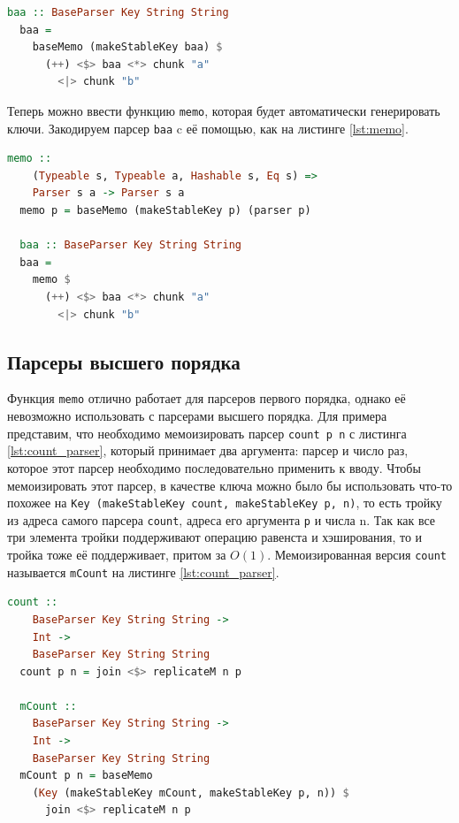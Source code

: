 \documentclass[times]{itmo-student-thesis}
\begin{document}
\begin{lstlisting}[language=Haskell,float=!h,caption={Пример использования makeStableKey},label={lst:makeStableKey_example}]
  baa :: BaseParser Key String String
  baa =
    baseMemo (makeStableKey baa) $
      (++) <$> baa <*> chunk "a"
        <|> chunk "b"
\end{lstlisting}

Теперь можно ввести функцию \lstinline{memo}, которая будет автоматически генерировать ключи. Закодируем парсер \lstinline{baa} c её
помощью, как на листинге \ref{lst:memo}.

\begin{lstlisting}[language=Haskell,float=!h,caption={Memo с автоматическим ключом},label={lst:memo}]
  memo :: 
    (Typeable s, Typeable a, Hashable s, Eq s) => 
    Parser s a -> Parser s a
  memo p = baseMemo (makeStableKey p) (parser p)

  baa :: BaseParser Key String String
  baa =
    memo $
      (++) <$> baa <*> chunk "a"
        <|> chunk "b"
\end{lstlisting}

\subsection{Парсеры высшего порядка}

Функция \lstinline{memo} отлично работает для парсеров первого порядка, однако её невозможно использовать с
парсерами высшего порядка. Для примера представим, что необходимо мемоизировать парсер
\lstinline{count p n} с листинга \ref{lst:count_parser}, который  принимает два аргумента: парсер и число раз,
которое этот парсер необходимо последовательно применить к вводу. Чтобы мемоизировать этот парсер, в качестве ключа
можно было бы использовать что-то похожее на \lstinline{Key (makeStableKey count, makeStableKey p, n)}, то есть тройку из
адреса самого парсера \lstinline{count}, адреса его аргумента \lstinline{p} и числа n. Так как все три элемента тройки поддерживают
операцию равенста и хэширования, то и тройка тоже её поддерживает, притом за $O(1)$. Мемоизированная версия \lstinline{count} называется \lstinline{mCount}
на листинге \ref{lst:count_parser}.

\begin{lstlisting}[language=Haskell,float=!h,caption={Парсер высшего порядка count},label={lst:count_parser}]
  count :: 
    BaseParser Key String String -> 
    Int -> 
    BaseParser Key String String
  count p n = join <$> replicateM n p

  mCount :: 
    BaseParser Key String String -> 
    Int -> 
    BaseParser Key String String
  mCount p n = baseMemo 
    (Key (makeStableKey mCount, makeStableKey p, n)) $ 
      join <$> replicateM n p
\end{lstlisting}
\end{document}
